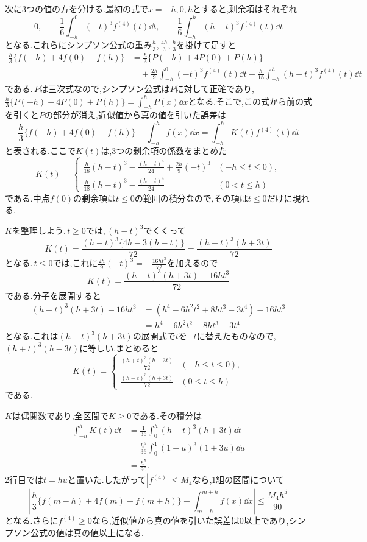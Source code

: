 次に3つの値の方を分ける.最初の式で$x=-h,0,h$とすると,剰余項はそれぞれ
\[
 0,\qquad
 \frac16\int_{-h}^0(-t)^3f^{(4)}(t)\dd t,\qquad
 \frac16\int_{-h}^h(h-t)^3f^{(4)}(t)\dd t
\]
となる.これらにシンプソン公式の重み$\frac h3$,\,$\frac{4h}3$,\,$\frac h3$を掛けて足すと
\begin{align*}
 \frac h3\{f(-h)+4f(0)+f(h)\}
 &=\frac h3\{P(-h)+4P(0)+P(h)\}\\
 &\quad+\frac{2h}{9}\int_{-h}^0(-t)^3f^{(4)}(t)\dd t
  +\frac h{18}\int_{-h}^h(h-t)^3f^{(4)}(t)\dd t
\end{align*}
である.\,$P$は三次式なので,シンプソン公式は$P$に対して正確であり,\,$\frac h3\{P(-h)+4P(0)+P(h)\}=\int_{-h}^hP(x)\dd x$となる.そこで,この式から前の式を引くと$P$の部分が消え,近似値から真の値を引いた誤差は
\[
 \frac h3\{f(-h)+4f(0)+f(h)\}
 -\int_{-h}^hf(x)\dd x
 =\int_{-h}^hK(t)f^{(4)}(t)\dd t
\]
と表される.ここで$K(t)$は,3つの剰余項の係数をまとめた
\[
 K(t)=
 \begin{cases}
 \frac h{18}(h-t)^3-\frac{(h-t)^4}{24}+\frac{2h}{9}(-t)^3&(-h\le t\le0),\\[4pt]
 \frac h{18}(h-t)^3-\frac{(h-t)^4}{24}&(0<t\le h)
 \end{cases}
\]
である.中点$f(0)$の剰余項は$t\le0$の範囲の積分なので,その項は$t\le0$だけに現れる.

$K$を整理しよう.\,$t\ge0$では,\,$(h-t)^3$でくくって
\[
 K(t)=\frac{(h-t)^3\{4h-3(h-t)\}}{72}
 =\frac{(h-t)^3(h+3t)}{72}
\]
となる.\,$t\le0$では,これに$\frac{2h}{9}(-t)^3=-\frac{16ht^3}{72}$を加えるので
\[
 K(t)=\frac{(h-t)^3(h+3t)-16ht^3}{72}
\]
である.分子を展開すると
\begin{align*}
 (h-t)^3(h+3t)-16ht^3
 &=(h^4-6h^2t^2+8ht^3-3t^4)-16ht^3\\
 &=h^4-6h^2t^2-8ht^3-3t^4
\end{align*}
となる.これは$(h-t)^3(h+3t)$の展開式で$t$を$-t$に替えたものなので,\,$(h+t)^3(h-3t)$に等しい.まとめると
\[
 K(t)=
 \begin{cases}
 \frac{(h+t)^3(h-3t)}{72}&(-h\le t\le0),\\[4pt]
 \frac{(h-t)^3(h+3t)}{72}&(0\le t\le h)
 \end{cases}
\]
である.

$K$は偶関数であり,全区間で$K\ge0$である.その積分は
\begin{align*}
 \int_{-h}^hK(t)\dd t
 &=\frac1{36}\int_0^h(h-t)^3(h+3t)\dd t\\
 &=\frac{h^5}{36}\int_0^1(1-u)^3(1+3u)\dd u\\
 &=\frac{h^5}{90}.
\end{align*}
2行目では$t=hu$と置いた.したがって$|f^{(4)}|\le M_4$なら,1組の区間について
\[
 \left|\frac h3\{f(m-h)+4f(m)+f(m+h)\}
 -\int_{m-h}^{m+h}f(x)\dd x\right|
 \le\frac{M_4h^5}{90}
\]
となる.さらに$f^{(4)}\ge0$なら,近似値から真の値を引いた誤差は$0$以上であり,シンプソン公式の値は真の値以上になる.

